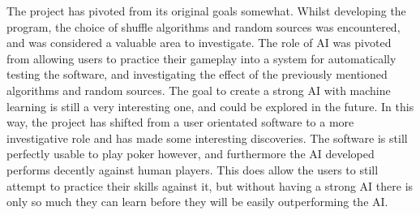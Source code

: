 The project has pivoted from its original goals somewhat. Whilst
developing the program, the choice of shuffle algorithms and random sources
was encountered, and was considered a valuable area to investigate. The
role of AI was pivoted from allowing users to practice their gameplay into
a system for automatically testing the software, and investigating the
effect of the previously mentioned algorithms and random sources. The goal
to create a strong AI with machine learning is still a very interesting one,
and could be explored in the future. In this way, the project has shifted
from a user orientated software to a more investigative role and has made
some interesting discoveries. The software is still perfectly usable to play
poker however, and furthermore the AI developed performs decently against
human players. This does allow the users to still attempt to practice their
skills against it, but without having a strong AI there is only so much they
can learn before they will be easily outperforming the AI\@.
